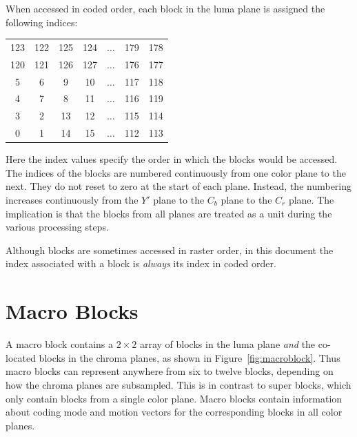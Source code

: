 \documentclass[9pt,letterpaper]{book}
\numberwithin{equation}{chapter}
\numberwithin{figure}{chapter}
\numberwithin{table}{chapter}
\begin{document}
When accessed in coded order, each block in the luma plane is assigned the
 following indices:

\vspace{\baselineskip}
\begin{center}
\begin{tabular}{|cccc|c|cc|}\hline
123 & 122 & 125 & 124 & $\ldots$ & 179 & 178 \\
120 & 121 & 126 & 127 & $\ldots$ & 176 & 177 \\\hline
  5 &   6 &   9 &  10 & $\ldots$ & 117 & 118 \\
  4 &   7 &   8 &  11 & $\ldots$ & 116 & 119 \\
  3 &   2 &  13 &  12 & $\ldots$ & 115 & 114 \\
  0 &   1 &  14 &  15 & $\ldots$ & 112 & 113 \\\hline
\end{tabular}
\end{center}
\vspace{\baselineskip}

Here the index values specify the order in which the blocks would be accessed.
The indices of the blocks are numbered continuously from one color plane to the
 next.
They do not reset to zero at the start of each plane.
Instead, the numbering increases continuously from the $Y'$ plane to the $C_b$
 plane to the $C_r$ plane.
The implication is that the blocks from all planes are treated as a unit during
 the various processing steps.

Although blocks are sometimes accessed in raster order, in this document the
 index associated with a block is {\em always} its index in coded order.

\section{Macro Blocks}
\label{sec:mbs}

A macro block contains a $2\times 2$ array of blocks in the luma plane
 {\em and} the co-located blocks in the chroma planes, as shown in
 Figure~\ref{fig:macroblock}.
Thus macro blocks can represent anywhere from six to twelve blocks, depending
 on how the chroma planes are subsampled.
This is in contrast to super blocks, which only contain blocks from a single
 color plane.
Macro blocks contain information about coding mode and motion vectors for the
 corresponding blocks in all color planes.
\end{document}
